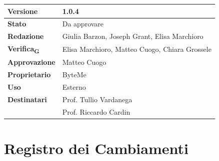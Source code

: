\documentclass[11pt,a4paper]{article}
\newcommand{\gls}[1]{#1\textsubscript{G}}
\begin{document}
\begin{titlepage}
    \begin{table}[H]
        \centering
        \begin{tabular}{|l|p{5cm}|}
            \hline
            \textbf{Versione} & 1.0.4 \\
            \hline
            \textbf{Stato} & Da approvare \\
            \hline
            \textbf{Redazione} & Giulia Barzon, Joseph Grant, Elisa Marchioro \\
            \hline
            \textbf{\gls{Verifica}} & Elisa Marchioro, Matteo Cuogo, Chiara Grossele \\
            \hline
            \textbf{Approvazione} & Matteo Cuogo \\
            \hline
            \textbf{Proprietario} & ByteMe \\
            \hline
            \textbf{Uso} & Esterno \\
            \hline
            \textbf{Destinatari} & Prof. Tullio Vardanega \\ & Prof. Riccardo Cardin \\
            \hline
        \end{tabular}
    \end{table}
    
    \vfill
\end{titlepage}

\section*{Registro dei Cambiamenti}
\end{document}
